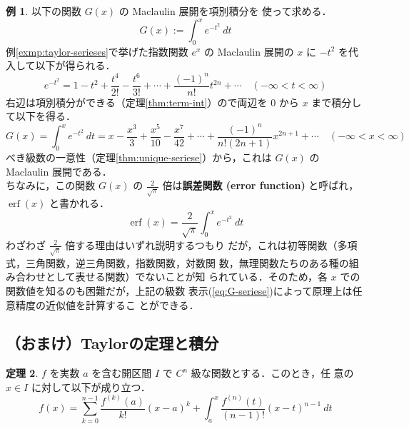 \documentclass[10pt, uplatex, dvipdfmx]{jsarticle}
\theoremstyle{definition}
\newtheorem{theorem}{定理}[section]
\newtheorem{example}[theorem]{例}
\numberwithin{equation}{section}
\newcommand{\ds}{\displaystyle}
\DeclareMathOperator{\erf}{erf}
\begin{document}
\begin{example}\label{exmp:int-exp-x2-taylor}
  以下の関数 $G(x)$ の Maclaulin 展開を項別積分を
  使って求める．
  \[
    G(x) := \int_{0}^{x} e^{-t^2} \ dt
  \]
  例\ref{exmp:taylor-serieses}で挙げた指数関数 $e^x$ の Maclaulin 展開の $x$ に $-t^2$ を代入して以下が得られる．
  \[
    e^{-t^2} = 1 - t^2 + \frac{t^4}{2!} - \frac{t^6}{3!} + \cdots + \frac{(-1)^n}{n!}t^{2n} + \cdots \quad (- \infty < t < \infty)
  \]
  右辺は項別積分ができる（定理\ref{thm:term-int}）ので両辺を $0$ から $x$ まで積分して以下を得る．
  \begin{equation}\label{eq:G-seriese}
    G(x) = \int_{0}^{x}e^{-t^2} \ dt = x - \frac{x^3}{3} + \frac{x^5}{10} - \frac{x^7}{42} + \cdots + \frac{(-1)^n}{n! (2n+1)}x^{2n+1} + \cdots
    \quad (- \infty < x < \infty)
  \end{equation}
  べき級数の一意性（定理\ref{thm:unique-seriese}）から，これは $G(x)$ の Maclaulin 展開である．\\
 

  
  ちなみに，この関数 $G(x)$ の $\ds \frac{2}{\sqrt{\pi}}$ 倍は\textbf{誤差関数 (error function)}
  と呼ばれ，$\erf(x)$ と書かれる．
  \[
    \erf (x) = \frac{2}{\sqrt{\pi}}\int_{0}^{x} e^{-t^2} \ dt 
  \]
  わざわざ $\ds \frac{2}{\sqrt{\pi}}$ 倍する理由はいずれ説明するつもり
  だが，これは初等関数（多項式，三角関数，逆三角関数，指数関数，対数関
  数，無理関数たちのある種の組み合わせとして表せる関数）でないことが知
  られている．そのため，各 $x$ での関数値を知るのも困難だが，上記の級数
  表示(\ref{eq:G-seriese})によって原理上は任意精度の近似値を計算するこ
  とができる．
\end{example}

\newpage
\subsection{（おまけ）Taylorの定理と積分}

\begin{theorem}\label{thm:taylor-int}
  $f$ を実数 $a$ を含む開区間 $I$ で $C^n$ 級な関数とする．このとき，任
  意の $x \in I$ に対して以下が成り立つ．
  \[
    f(x) = \sum_{k=0}^{n-1} \frac{f^{(k)}(a)}{k!}(x-a)^k +
    \int_{a}^{x}\frac{f^{(n)}(t)}{(n-1)!}(x-t)^{n-1} \ dt
  \]
\end{theorem}
\end{document}
